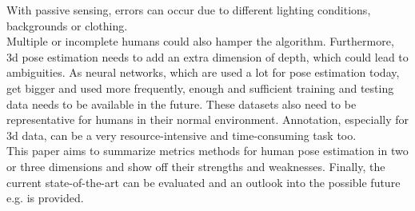 With passive sensing, errors can occur due to different lighting conditions, backgrounds or clothing. 
\\
Multiple or incomplete humans could also hamper the algorithm. Furthermore, 3d pose estimation needs to add an extra dimension of depth, which could lead to ambiguities. As neural networks, which are used a lot for pose estimation today, get bigger and used more frequently, enough and sufficient training and testing data needs to be available in the future. These datasets also need to be representative for humans in their normal environment. Annotation, especially for 3d data, can be a very resource-intensive and time-consuming task too.
\\
This paper aims to summarize metrics methods for human pose estimation in two or three dimensions and show off their strengths and weaknesses. Finally, the current state-of-the-art can be evaluated and an outlook into the possible future e.g. is provided.